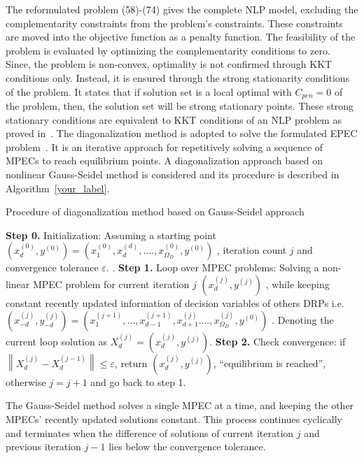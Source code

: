 \documentclass[journal]{IEEEtran}
\begin{document}
The reformulated problem (58)-(74) gives the complete NLP model, excluding the complementarity constraints from the problem's constraints. These constraints are moved into the objective function as a penalty function. The feasibility of the problem is evaluated by optimizing the complementarity conditions to zero. Since, the problem is non-convex, optimality is not confirmed through KKT conditions only. Instead, it is ensured through the strong stationarity conditions of the problem. It states that if solution set is a local optimal with ${C_{pen}} = 0$ of the problem, then, the solution set will be strong stationary points. These strong stationary conditions are equivalent to KKT conditions of an NLP problem as proved in~\cite{fletcher2004solving}. The diagonalization method is adopted to solve the formulated EPEC problem~\cite{hobbs2000strategic,su2004sequential}. It is an iterative approach for repetitively solving a sequence of MPECs to reach equilibrium points. A diagonalization approach based on nonlinear Gauss-Seidel method is considered and its procedure is described in Algorithm~\mbox{\ref{your_label}}\mbox{\cite{hu2003mathematical,su2004sequential,hobbs2000strategic}}.
\begin{algorithm}[t]
	\caption{Procedure of diagonalization method based on Gauss-Seidel approach }\label{your_label}
	\begin{algorithmic}[1]
		\STATE  \textbf{Step 0.}  Initialization: Assuming a starting point $({x_d^{(0)}},{y^{(0)}}) = (x_1^{(0)},x_d^{(d)},....,x_{{\Omega _D}}^{(0)},{y^{(0)}})$  , iteration count $j$ and convergence tolerance $\varepsilon$. .
		\STATE  \textbf{Step 1.}  Loop over MPEC problems: Solving a non-linear MPEC problem for current iteration $j$ $({x_{d}^{(j)}},{y^{(j)}})$  , while keeping constant recently updated information of decision variables of others DRPs i.e. $(x_{ - d}^{(j)},y_{ - d}^{(j)}) = (x_1^{(j + 1)},...,x_{d - 1}^{(j + 1)},x_{d + 1}^{(j)}....,x_{{\Omega _D}}^{(j)},{y^{(0)}})$  . Denoting the current loop solution as $X_d^{(j)} = (x_d^{(j)},{y^{(j)}})$. 
		\STATE  \textbf{Step 2.} Check convergence: if $\left\| {X_d^{(j)} - X_d^{(j - 1)}} \right\| \le \varepsilon $, return $(x_d^{(j)},{y^{(j)}})$, “equilibrium is reached”, otherwise $j=j+1$  and go back to step 1.
	\end{algorithmic}
\end{algorithm}

The Gauss-Seidel method solves a single MPEC at a time, and keeping the other MPECs' recently updated solutions constant. This process continues cyclically and terminates when the difference of solutions of current iteration $j$ and previous iteration $j-1$ lies below the convergence tolerance. %
\vspace{-2mm}
\end{document}

